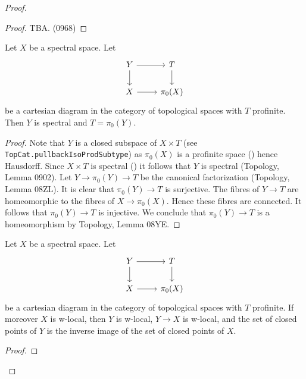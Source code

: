 \begin{proof}
\begin{proof}
  TBA. (0968)
\end{proof}

\begin{lemma}
Let $X$ be a spectral space. Let
\[
\begin{tikzcd}
Y \arrow[r] \arrow[d] & T \arrow[d] \\
X \arrow[r] & \pi_0(X)
\end{tikzcd}
\]
be a cartesian diagram in the category of topological spaces with $T$ profinite. Then $Y$ is spectral and $T = \pi_0(Y)$.
\label{thm:cartesian-profinite}
\end{lemma}

\begin{proof}
  Note that $Y$ is a closed subspace of $X \times T$ (see \verb`TopCat.pullbackIsoProdSubtype`) as $\pi_0(X)$ is a profinite space () hence Hausdorff. Since $X \times T$ is spectral () it follows that $Y$ is spectral (Topology, Lemma 0902). Let $Y \to \pi_0(Y) \to T$ be the canonical factorization (Topology, Lemma 08ZL). It is clear that $\pi_0(Y) \to T$ is surjective. The fibres of $Y \to T$ are homeomorphic to the fibres of $X \to \pi_0(X)$. Hence these fibres are connected. It follows that $\pi_0(Y) \to T$ is injective. We conclude that $\pi_0(Y) \to T$ is a homeomorphism by Topology, Lemma 08YE.
\end{proof}

\begin{lemma}
Let $X$ be a spectral space. Let
\[
\begin{tikzcd}
Y \arrow[r] \arrow[d] & T \arrow[d] \\
X \arrow[r] & \pi_0(X)
\end{tikzcd}
\]
be a cartesian diagram in the category of topological spaces with $T$ profinite. If moreover $X$ is w-local, then $Y$ is w-local, $Y \to X$ is w-local, and the set of closed points of $Y$ is the inverse image of the set of closed points of $X$.
\label{thm:cartesian-profinite-w-local}
\end{lemma}

\begin{proof}



\end{proof}
\end{proof}
